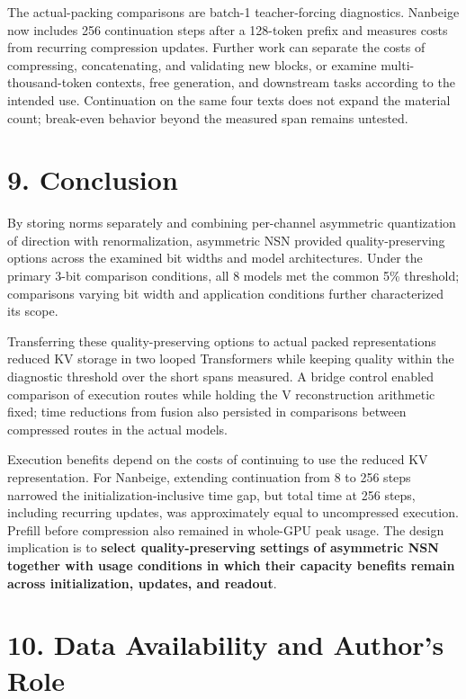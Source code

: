 \documentclass[10pt,a4paper]{article}
\begin{document}
The actual-packing comparisons are batch-1 teacher-forcing diagnostics. Nanbeige now includes 256 continuation steps after a 128-token prefix and measures costs from recurring compression updates. Further work can separate the costs of compressing, concatenating, and validating new blocks, or examine multi-thousand-token contexts, free generation, and downstream tasks according to the intended use. Continuation on the same four texts does not expand the material count; break-even behavior beyond the measured span remains untested.

\section{9. Conclusion}\label{conclusion}

By storing norms separately and combining per-channel asymmetric quantization of direction with renormalization, asymmetric NSN provided quality-preserving options across the examined bit widths and model architectures. Under the primary 3-bit comparison conditions, all 8 models met the common 5\% threshold; comparisons varying bit width and application conditions further characterized its scope.

Transferring these quality-preserving options to actual packed representations reduced KV storage in two looped Transformers while keeping quality within the diagnostic threshold over the short spans measured. A bridge control enabled comparison of execution routes while holding the V reconstruction arithmetic fixed; time reductions from fusion also persisted in comparisons between compressed routes in the actual models.

Execution benefits depend on the costs of continuing to use the reduced KV representation. For Nanbeige, extending continuation from 8 to 256 steps narrowed the initialization-inclusive time gap, but total time at 256 steps, including recurring updates, was approximately equal to uncompressed execution. Prefill before compression also remained in whole-GPU peak usage. The design implication is to \textbf{select quality-preserving settings of asymmetric NSN together with usage conditions in which their capacity benefits remain across initialization, updates, and readout}.

\section{10. Data Availability and Author's Role}\label{data-availability-and-authors-role}
\end{document}
